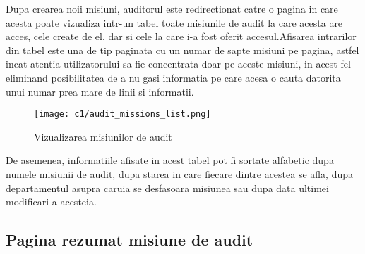 Dupa crearea noii misiuni, auditorul este redirectionat catre o pagina in care acesta poate vizualiza intr-un tabel toate misiunile de audit la care acesta are acces, cele create de el, dar si cele la care i-a fost oferit accesul.Afisarea intrarilor din tabel este una de tip paginata cu un numar de sapte misiuni pe pagina, astfel incat atentia utilizatorului sa fie concentrata doar pe aceste misiuni, in acest fel eliminand posibilitatea de a nu gasi informatia pe care acesa o cauta datorita unui numar prea mare de linii si informatii.
	\vspace{0.5 cm}
\begin{figure}[h]
	\centering
	
	\texttt{[image: c1/audit\_missions\_list.png]}
	\caption{Vizualizarea misiunilor de audit}
\end{figure}
De asemenea, informatiile afisate in acest tabel pot fi sortate alfabetic dupa numele misiunii de audit, dupa starea in care fiecare dintre acestea se afla, dupa departamentul asupra caruia se desfasoara misiunea  sau dupa data ultimei modificari a acesteia.

\subsection{Pagina rezumat misiune de audit}

